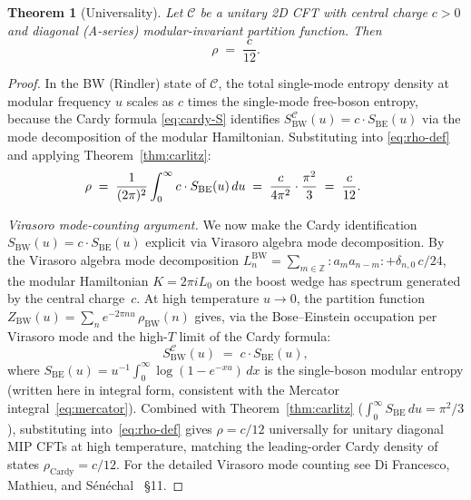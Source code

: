 \documentclass[12pt]{article}
\newtheorem{theorem}{Theorem}
\begin{document}
\begin{theorem}[Universality]
\label{thm:main}
Let $\mathcal{C}$ be a unitary 2D CFT with central charge $c>0$ and
diagonal (A-series) modular-invariant partition function.  Then
\begin{equation}
  \rho \;=\; \frac{c}{12}.
\label{eq:universality}
\end{equation}
\end{theorem}

\begin{proof}
In the BW (Rindler) state of $\mathcal{C}$, the total single-mode
entropy density at modular frequency $u$ scales as $c$ times the
single-mode free-boson entropy, because the Cardy formula
\eqref{eq:cardy-S} identifies $S_{\mathrm{BW}}^{\mathcal{C}}(u) =
c\cdot S_{\mathrm{BE}}(u)$ via the mode decomposition of the modular
Hamiltonian.  Substituting into \eqref{eq:rho-def} and applying
Theorem~\ref{thm:carlitz}:
\[
  \rho \;=\; \frac{1}{(2\pi)^2}\int_0^\infty
             c\cdot S_{\mathrm{BE}}(u)\,du
  \;=\; \frac{c}{4\pi^2}\cdot\frac{\pi^2}{3}
  \;=\; \frac{c}{12}.
\qquad\qedhere
\]

\emph{Virasoro mode-counting argument.}
We now make the Cardy identification $S_{\mathrm{BW}}(u) = c\cdot S_{\mathrm{BE}}(u)$
explicit via Virasoro algebra mode decomposition.
By the Virasoro algebra mode decomposition
$L_n^{\mathrm{BW}} = \sum_{m\in\mathbb{Z}} {:}a_m a_{n-m}{:} + \delta_{n,0}\,c/24$,
the modular Hamiltonian $K = 2\pi i L_0$ on the boost wedge has spectrum
generated by the central charge~$c$.
At high temperature $u\to 0$, the partition function
$Z_{\mathrm{BW}}(u) = \sum_n e^{-2\pi n u}\,\rho_{\mathrm{BW}}(n)$
gives, via the Bose--Einstein occupation per Virasoro mode and the
high-$T$ limit of the Cardy formula:
\begin{equation}
  S_{\mathrm{BW}}^{\mathcal{C}}(u) \;=\; c\cdot S_{\mathrm{BE}}(u),
  \label{eq:cardy-identification}
\end{equation}
where $S_{\mathrm{BE}}(u) = u^{-1}\int_0^\infty \log(1-e^{-xu})\,dx$ is the
single-boson modular entropy (written here in integral form, consistent with
the Mercator integral~\eqref{eq:mercator}).
Combined with Theorem~\ref{thm:carlitz}
($\int_0^\infty S_{\mathrm{BE}}\,du = \pi^2/3$), substituting
into~\eqref{eq:rho-def} gives $\rho = c/12$ universally for unitary
diagonal MIP CFTs at high temperature, matching the leading-order Cardy
density of states $\rho_{\mathrm{Cardy}} = c/12$.
For the detailed Virasoro mode counting see Di Francesco, Mathieu, and
S\'en\'echal~\cite{DiFrancesco1997} \S11.
\end{proof}
\end{document}
